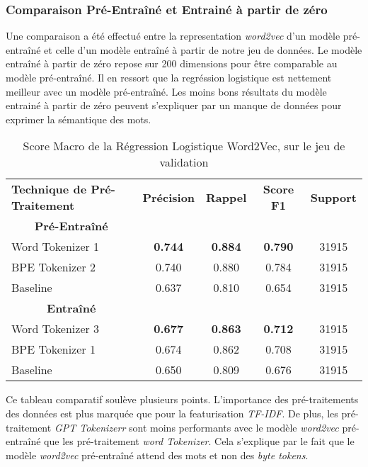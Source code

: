 \subsubsection{Comparaison Pré-Entraîné et Entrainé à partir de zéro}
Une comparaison a été effectué entre la representation \textit{word2vec} d'un modèle pré-entraîné et celle d'un modèle entraîné à partir de notre jeu de données. 
Le modèle entraîné à partir de zéro repose sur 200 dimensions pour être comparable au modèle pré-entraîné. 
Il en ressort que la regréssion logistique est nettement meilleur avec un modèle pré-entraîné. Les moins bons résultats du modèle entrainé à partir de zéro peuvent s'expliquer par un manque de données pour exprimer la sémantique des mots.
\begin{table}[ht]
    \centering
    \caption{Score Macro de la Régression Logistique Word2Vec, sur le jeu de validation}
    \begin{tabular}{lcccc}
    \hline
    \textbf{Technique de Pré-Traitement} & \textbf{Précision} & \textbf{Rappel} & \textbf{Score F1} & \textbf{Support}  \\
    \multicolumn{1}{c}{\textbf{Pré-Entraîné}} \\
    Word Tokenizer 1             & \textbf{0.744}              & \textbf{0.884}           & \textbf{0.790}            & 31915            \\
    BPE Tokenizer 2              & 0.740              & 0.880           & 0.784            & 31915            \\ \hline 
    Baseline                     & 0.637              & 0.810           & 0.654            & 31915            \\
    \hline \multicolumn{1}{c}{\textbf{Entraîné}} \\
    Word Tokenizer 3             & \textbf{0.677}              & \textbf{0.863}           & \textbf{0.712}            & 31915            \\
    BPE Tokenizer 1              & 0.674              & 0.862           & 0.708            & 31915            \\ \hline
    Baseline               & 0.650              & 0.809           & 0.676            & 31915            \\ 
    \hline \end{tabular}
    \label{tab:results}
\end{table}

Ce tableau comparatif soulève plusieurs points.
L'importance des pré-traitements des données est plus marquée que pour la featurisation \textit{TF-IDF}. 
De plus, les pré-traitement \textit{GPT Tokenizerr} sont moins performants avec le modèle \textit{word2vec} pré-entraîné que les pré-traitement \textit{word Tokenizer}. 
Cela s'explique par le fait que le modèle \textit{word2vec} pré-entraîné attend des mots et non des \textit{byte tokens}.
